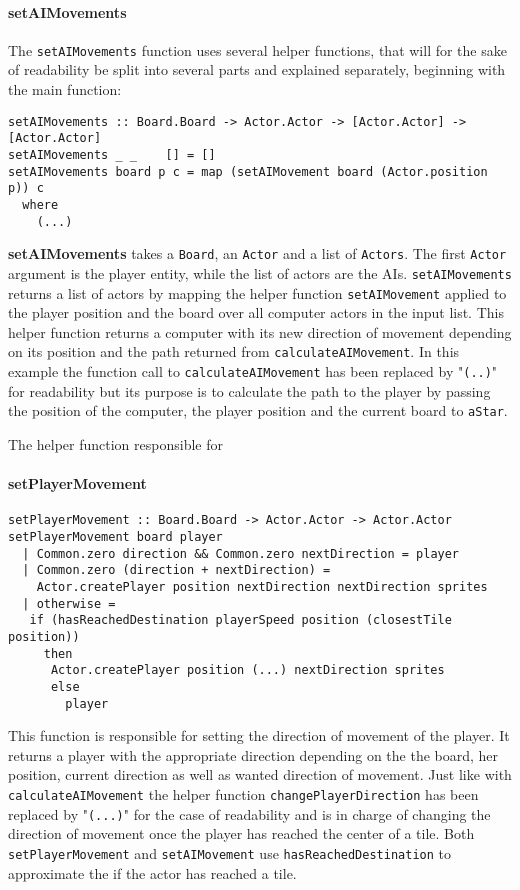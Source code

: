 \documentclass{article}
\begin{document}
			\paragraph{setAIMovements}
            The \texttt{setAIMovements} function uses several helper functions, that will for the sake of readability be split into several parts and explained separately, beginning with the main function:
\begin{verbatim}
setAIMovements :: Board.Board -> Actor.Actor -> [Actor.Actor] -> [Actor.Actor]
setAIMovements _ _    [] = []
setAIMovements board p c = map (setAIMovement board (Actor.position p)) c
  where
  	(...)
\end{verbatim}
\textbf{setAIMovements} takes a \texttt{Board}, an \texttt{Actor} and a list of \texttt{Actors}. The first \texttt{Actor} argument is the player entity, while the list of actors are the AIs.
\texttt{setAIMovements} returns a list of actors by mapping the helper function \texttt{setAIMovement} applied to the player position and the board over all computer actors in the input list. This helper function returns a computer with its new direction of movement depending on its position and the path returned from \texttt{calculateAIMovement}. In this example the function call to \texttt{calculateAIMovement} has been replaced by "\texttt{(..)}" for readability but its purpose is to calculate the path to the player by passing the position of the computer, the player position and the current board to \texttt{aStar}.

The helper function responsible for


\paragraph{setPlayerMovement}
\begin{verbatim}
setPlayerMovement :: Board.Board -> Actor.Actor -> Actor.Actor
setPlayerMovement board player
  | Common.zero direction && Common.zero nextDirection = player
  | Common.zero (direction + nextDirection) =
    Actor.createPlayer position nextDirection nextDirection sprites
  | otherwise =
   if (hasReachedDestination playerSpeed position (closestTile position))
     then
      Actor.createPlayer position (...) nextDirection sprites
      else
        player
\end{verbatim}
This function is responsible for setting the direction of movement of the player. It returns a player with the appropriate direction depending on the the board, her position, current direction as well as  wanted direction of movement. Just like with \texttt{calculateAIMovement} the helper function \texttt{changePlayerDirection} has been replaced by "\texttt{(...)}" for the case of readability and is in charge of changing the direction of movement once the player has reached the center of a tile. Both \texttt{setPlayerMovement} and \texttt{setAIMovement} use \texttt{hasReachedDestination} to approximate the if the actor has reached a tile.
\end{document}
